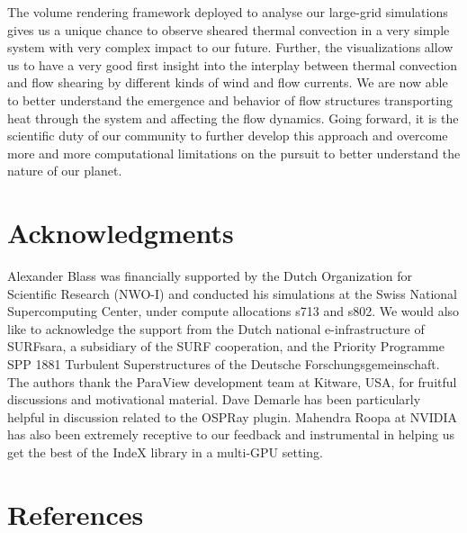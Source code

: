 \documentclass[5p,times]{elsarticle}
\begin{document}
The volume rendering framework deployed to analyse our large-grid simulations gives us a unique chance to observe sheared thermal convection in a very simple system with very complex impact to our future. Further, the visualizations allow us to have a very good first insight into the interplay between thermal convection and flow shearing by different kinds of wind and flow currents. We are now able to better understand the emergence and behavior of flow structures transporting heat through the system and affecting the flow dynamics. Going forward, it is the scientific duty of our community to further develop this approach and overcome more and more computational limitations on the pursuit to better understand the nature of our planet.  




\section*{Acknowledgments}

Alexander Blass was financially supported by the Dutch Organization for Scientific Research (NWO-I) and conducted his simulations at the Swiss National Supercomputing Center, under compute allocations s713 and s802. We would also like to acknowledge the support from the Dutch national e-infrastructure of SURFsara, a subsidiary of the SURF cooperation, and the Priority Programme SPP 1881 Turbulent Superstructures of the Deutsche Forschungsgemeinschaft. The authors thank the ParaView development team at Kitware, USA, for fruitful discussions and motivational material. Dave Demarle has been particularly helpful in discussion related to the OSPRay plugin. Mahendra Roopa ‎at NVIDIA has also been extremely receptive to our feedback and instrumental in helping us get the best of the IndeX library in a multi-GPU setting.

\section*{References}
 

\end{document}
